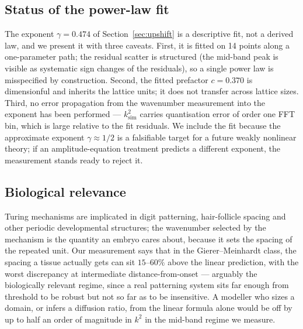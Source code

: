 \subsection{Status of the power-law fit}

The exponent $\gamma = 0.474$ of Section~\ref{sec:upshift} is a descriptive
fit, not a derived law, and we present it with three caveats. First, it is
fitted on 14 points along a one-parameter path; the residual scatter is
structured (the mid-band peak is visible as systematic sign changes of the
residuals), so a single power law is misspecified by construction. Second,
the fitted prefactor $c = 0.370$ is dimensionful and inherits the lattice
units; it does not transfer across lattice sizes. Third, no error propagation
from the wavenumber measurement into the exponent has been performed ---
$k^2_{\mathrm{sim}}$ carries quantisation error of order one FFT bin, which
is large relative to the fit residuals. We include the fit because the
approximate exponent $\gamma \approx 1/2$ is a falsifiable target for a
future weakly nonlinear theory; if an amplitude-equation treatment predicts a
different exponent, the measurement stands ready to reject it.

\subsection{Biological relevance}

Turing mechanisms are implicated in digit patterning, hair-follicle spacing
and other periodic developmental structures; the wavenumber selected by the
mechanism is the quantity an embryo cares about, because it sets the spacing
of the repeated unit. Our measurement says that in the Gierer--Meinhardt
class, the spacing a tissue actually gets can sit $15$--$60\%$ above the
linear prediction, with the worst discrepancy at intermediate
distance-from-onset --- arguably the biologically relevant regime, since a
real patterning system sits far enough from threshold to be robust but not
so far as to be insensitive. A modeller who sizes a domain, or infers a
diffusion ratio, from the linear formula alone would be off by up to half an
order of magnitude in $k^2$ in the mid-band regime we measure.
